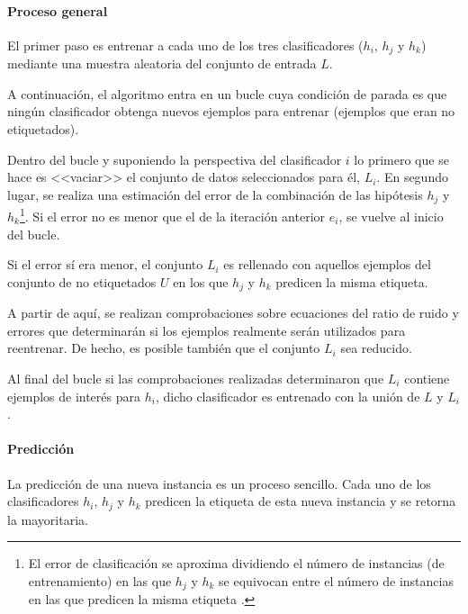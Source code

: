 \paragraph{Proceso general}

El primer paso es entrenar a cada uno de los tres clasificadores ($h_i$, $h_j$ y
$h_k$) mediante una muestra aleatoria del conjunto de entrada $L$.

A continuación, el algoritmo entra en un bucle cuya condición de parada es que
ningún clasificador obtenga nuevos ejemplos para entrenar (ejemplos que eran no
etiquetados). 

Dentro del bucle y suponiendo la perspectiva del clasificador $i$ lo primero que
se hace es <<vaciar>> el conjunto de datos seleccionados para él, $L_i$. En
segundo lugar, se realiza una estimación del error de la combinación de las
hipótesis $h_j$ y $h_k$\footnote{El error de clasificación se aproxima
dividiendo el número de instancias (de entrenamiento) en las que $h_j$ y $h_k$
se equivocan entre el número de instancias en las que predicen la misma etiqueta
\cite{1512038}.}. Si el error no es menor que el de la iteración anterior $e_i$,
se vuelve al inicio del bucle.

Si el error sí era menor, el conjunto $L_i$ es rellenado con aquellos ejemplos
del conjunto de no etiquetados $U$ en los que $h_j$ y $h_k$ predicen la misma
etiqueta.

A partir de aquí, se realizan comprobaciones sobre ecuaciones del ratio de ruido
y errores \cite{1512038} que determinarán si los ejemplos realmente serán
utilizados para reentrenar. De hecho, es posible también que el conjunto $L_i$
sea reducido.

Al final del bucle si las comprobaciones realizadas determinaron que $L_i$
contiene ejemplos de interés para $h_i$, dicho clasificador es entrenado con la
unión de $L$ y $L_i$.

\paragraph{Predicción}

La predicción de una nueva instancia es un proceso sencillo. Cada uno de los
clasificadores $h_i$, $h_j$ y $h_k$ predicen la etiqueta de esta nueva instancia
y se retorna la mayoritaria.


